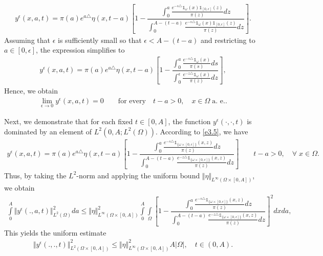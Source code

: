 \documentclass[10pt, a4]{amsart}
\makeatletter
\theoremstyle{plain}
\theoremstyle{definition}
\theoremstyle{remark}
\renewenvironment{proof}[1][\proofname]{\par
  \pushQED{\qed}%
  \normalfont \topsep6\p@\@plus6\p@\relax
  \trivlist
  \item[\hskip\labelsep
        \itshape
    #1\ \ref{#1}.]\ignorespaces
}{%
  \popQED\endtrivlist\@endpefalse
}
\numberwithin{equation}{section}
\makeatother
\begin{document}
\begin{proof}[of Theorem \ref{th1.4}]
\begin{align}
y^{\epsilon}(x,a,t)=\pi(a)e^{a\triangle}\eta(x,t-a)\left[1-\dfrac{\displaystyle\int_{0}^{a}\frac{e^{-s\triangle}\mathds{1}_{\omega}(x)\mathds{1}_{[0,\epsilon]}(z)}{\pi(z)}dz}{\displaystyle\int_{0}^{A-(t-a)}\frac{e^{-s\triangle}\mathds{1}_{\omega}(x)\mathds{1}_{[0,\epsilon]}(z)}{\pi(z)}dz}\right].
\end{align}
Assuming that \(\epsilon\) is sufficiently small so that \(\epsilon < A-(t-a)\) and restricting to \(a\in [0,\epsilon]\), the expression simplifies to
\begin{align}
y^{\epsilon}(x,a,t)=\pi(a)e^{a\triangle}\eta(x,t-a)\left[1-\dfrac{\displaystyle\int_{0}^{a}\frac{e^{-s\triangle}\mathds{1}_{\omega}(x)}{\pi(s)}ds}{\displaystyle\int_{0}^{\epsilon}\frac{e^{-z\triangle}\mathds{1}_{\omega}(x)}{\pi(z)}dz}\right],
\end{align}
Hence, we obtain
\begin{align}
\lim_{\epsilon\longrightarrow 0} y^{\epsilon}(x,a,t)=0 \qquad\text{for every}\quad t-a>0,\quad x\in \Omega\;\text{a. e.}.
\end{align}

Next, we demonstrate that for each fixed \(t\in[0,A]\), the function \(y^{\epsilon}(\cdot,\cdot,t)\) is dominated by an element of \(L^{2}(0,A; L^2(\Omega))\). According to \eqref{e3.5}, we have
\begin{align}
y^{\epsilon}(x,a,t)=\pi(a)e^{a\triangle}\eta(x,t-a)\left[1-\dfrac{\displaystyle\int_{0}^{a}\frac{e^{-s\triangle}\mathds{1}_{\lbrace\omega\times[0,\epsilon]\rbrace}(x,z)}{\pi(z)}dz}{\displaystyle\int_{0}^{A-(t-a)}\frac{e^{-z\triangle}\mathds{1}_{\lbrace\omega\times[0,\epsilon]\rbrace}(x,z)}{\pi(z)}dz}\right] \qquad t-a>0, \quad \forall \;x\in \Omega.
\end{align}
Thus, by taking the \(L^2\)-norm and applying the uniform bound \(\Vert \eta\Vert_{L^{\infty}(\Omega\times[0,A])}\), we obtain
\begin{align}
\int\limits_0^A \Vert y^{\epsilon}(.,a,t)\Vert_{L^2(\Omega)}^2 da\leq\Vert\eta\Vert^2_{L^{\infty}(\Omega\times[0,A])}\int\limits_0^A\int\limits_\Omega\left[1-\dfrac{\displaystyle\int_{0}^{a}\frac{e^{-s\triangle}\mathds{1}_{\lbrace\omega\times[0,\epsilon]\rbrace}(x,z)}{\pi(z)}dz}{\displaystyle\int_{0}^{A-(t-a)}\frac{e^{-z\triangle}\mathds{1}_{\lbrace\omega\times[0,\epsilon]\rbrace}(x,z)}{\pi(z)}dz}\right]^2dxda,
\end{align}
This yields the uniform estimate
\begin{align}
\Vert y^{\epsilon}(.,.,t)\Vert_{L^2(\Omega\times[0,A])}^2\leq\Vert\eta\Vert^2_{L^{\infty}(\Omega\times[0,A])}A \vert \Omega\vert,\quad t\in (0,A).
\end{align}


\end{proof}
\end{document}
